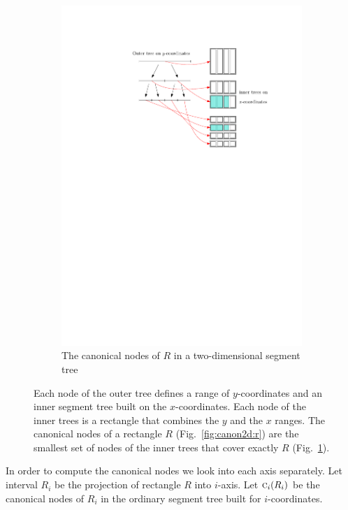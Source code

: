 \documentclass[english,gradu]{tktltiki2018}
\begin{document}
\begin{figure}
\begin{subfigure}[t]{0.75\textwidth}
		\includegraphics[width=\textwidth,page=1]{fig/segtree2d}
		\caption{The canonical nodes of $R$ in a two-dimensional segment tree}\label{fig:canon2d:tree}
	\end{subfigure}
	\caption{Each node of the outer tree defines a range of $y$-coordinates and an inner segment tree built on the $x$-coordinates.
	Each node of the inner trees is a rectangle that combines the $y$ and the $x$ ranges.
	The canonical nodes of a rectangle $R$ (Fig.~\ref{fig:canon2d:r}) are the smallest set of nodes of the inner trees that cover exactly $R$ (Fig.~\ref{fig:canon2d:tree}).}\label{fig:canon2d}
\end{figure}

In order to compute the canonical nodes we look into each axis separately.
Let interval $R_i$ be the projection of rectangle $R$ into $i$-axis.
Let $\canoni{R_i}{i}$ be the canonical nodes of $R_i$ in the ordinary segment tree built for $i$-coordinates.
\end{document}
